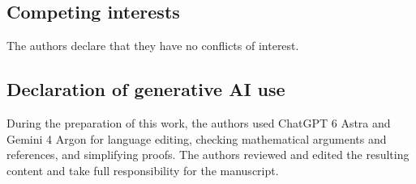 \documentclass[11pt,a4paper]{amsart}
\theoremstyle{uprightdefinition}
\theoremstyle{remark}\newtheorem{remark}[theorem]{Remark}
\begin{document}
\subsection*{Competing interests}
The authors declare that they have no conflicts of interest.


\subsection*{Declaration of generative AI use}
During the preparation of this work, the authors used ChatGPT 6 Astra and Gemini 4 Argon for language editing, checking mathematical arguments and references, and simplifying proofs. The authors reviewed and edited the resulting content and take full responsibility for the manuscript.
\end{document}
